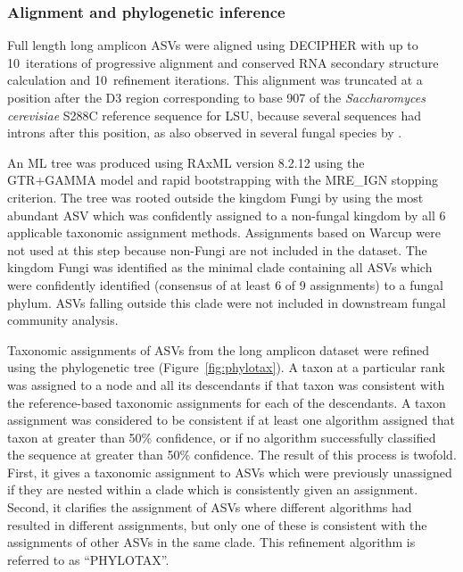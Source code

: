 \documentclass[
  12pt,
]{article}
\begin{document}
\hypertarget{alignment-and-phylogenetic-inference}{%
\subsubsection{Alignment and phylogenetic inference}\label{alignment-and-phylogenetic-inference}}

Full length long amplicon ASVs were aligned using DECIPHER \autocite{wright2015} with up to 10~iterations of progressive alignment and conserved RNA secondary structure calculation and 10~refinement iterations.
This alignment was truncated at a position after the D3 region corresponding to base 907 of the \emph{Saccharomyces cerevisiae} S288C reference sequence for LSU, because several sequences had introns after this position, as also observed in several fungal species by \textcite{holst-jensen1999}.

An ML tree was produced using RAxML version 8.2.12 \autocite{stamatakis2014} using the GTR+GAMMA model and rapid bootstrapping with the MRE\_IGN stopping criterion.
The tree was rooted outside the kingdom Fungi by using the most abundant ASV which was confidently assigned to a non-fungal kingdom by all 6 applicable taxonomic assignment methods.
Assignments based on Warcup were not used at this step because non-Fungi are not included in the dataset.
The kingdom Fungi was identified as the minimal clade containing all ASVs which were confidently identified (consensus of at least 6 of 9 assignments) to a fungal phylum.
ASVs falling outside this clade were not included in downstream fungal community analysis.

Taxonomic assignments of ASVs from the long amplicon dataset were refined using the phylogenetic tree (Figure~\ref{fig:phylotax}).
A taxon at a particular rank was assigned to a node and all its descendants if that taxon was consistent with the reference-based taxonomic assignments for each of the descendants.
A taxon assignment was considered to be consistent if at least one algorithm assigned that taxon at greater than 50\% confidence, or if no algorithm successfully classified the sequence at greater than 50\% confidence.
The result of this process is twofold.
First, it gives a taxonomic assignment to ASVs which were previously unassigned if they are nested within a clade which is consistently given an assignment.
Second, it clarifies the assignment of ASVs where different algorithms had resulted in different assignments, but only one of these is consistent with the assignments of other ASVs in the same clade.
This refinement algorithm is referred to as ``PHYLOTAX''.
\end{document}
